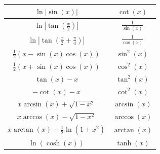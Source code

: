 \documentclass[a4paper,8pt]{extarticle}
\begin{document}
\begin{center}
\begin{tabular}{|c|c|}
                $ \ln |\sin(x)| $  &  $ \cot(x) $ \\
                \hline
                $ \ln \left|\tan(\frac{x}{2})\right| $  &  $ \frac{1}{\sin(x)} $ \\
                \hline
                $ \ln \left|\tan(\frac{x}{2}+\frac{\pi}{4})\right| $  &  $ \frac{1}{\cos(x)} $ \\
                \hline
                $ \frac{1}{2} (x-\sin(x)\cos(x)) $  &  $ \sin^2(x) $ \\
                \hline
                $ \frac{1}{2} (x+\sin(x)\cos(x)) $  &  $ \cos^2(x) $ \\
                \hline
                $ \tan(x)-x $  &  $ \tan^2(x) $ \\
                \hline
                $ -\cot(x)-x $  &  $ \cot^2(x) $ \\
                \hline
                $ x \arcsin(x) + \sqrt{1-x^2} $  &  $ \arcsin(x) $ \\
                \hline
                $ x \arccos(x) - \sqrt{1-x^2} $  &  $ \arccos(x) $ \\
                \hline
                $ x \arctan(x) - \frac{1}{2} \ln (1+x^2) $  &  $ \arctan(x) $ \\
                \hline
                $ \ln(\cosh(x)) $  &  $ \tanh(x) $ \\
                \hline
        \end{tabular}
\end{center}
    
\end{document}
